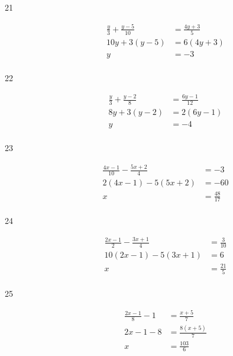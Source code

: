 \documentclass[letterpaper]{exam}
\begin{document}
\begin{description}
      \item[21] 
        \begin{align*}
          \frac{y}{3} + \frac{y - 5}{10} & = \frac{4y + 3}{5} \\
          10y + 3(y - 5)                 & = 6 (4y + 3) \\
          y                              & = \boxed{ -3 } \\
        \end{align*}

      \item[22] 
        \begin{align*}
          \frac{y}{3} + \frac{y - 2}{8} & = \frac{6y - 1}{12} \\
          8y + 3(y - 2)                 & = 2(6y - 1) \\
          y                             & = \boxed{ -4 } \\
        \end{align*}

      \item[23] 
        \begin{align*}
          \frac{4x - 1}{10} - \frac{5x + 2}{4} & = -3 \\
          2(4x - 1) - 5(5x + 2)                & = -60 \\
          x                                    & = \boxed{ \frac{48}{17} } \\
        \end{align*}

      \item[24] 
        \begin{align*}
          \frac{2x - 1}{2} - \frac{3x + 1}{4} & = \frac{3}{10} \\
          10 (2x - 1) -  5 (3x + 1)           & = 6 \\
          x                                   & = \boxed{ \frac{21}{5} } \\
        \end{align*}

      \item[25] 
        \begin{align*}
          \frac{2x - 1}{8} - 1 & = \frac{x + 5}{7} \\
          2x - 1 - 8           & = \frac{8(x + 5)}{7} \\
          x                    & = \boxed{ \frac{103}{6} } \\
        \end{align*}


\end{description}
\end{document}
